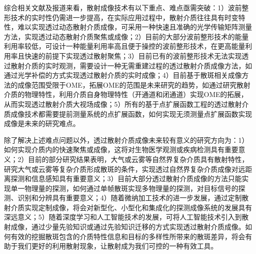 综合相关文献及报道来看，散射成像技术有以下重点、难点亟需突破：1）波前整形技术的实时性仍需进一步提高，在实际应用过程中，散射介质往往具有时变特性，难以实现透过动态散射介质成像，可采用一种快速且准确的光学传输矩阵测量方法，实现透过动态散射介质聚焦或成像；2）目前的大部分波前整形技术的能量利用率较低，可设计一种能量利用率高且便于操控的波前整形技术，在更高能量利用率且快速的前提下实现透过散射聚焦；3）目前已有的波前整形技术无法实现透过散射介质的实时观测，需要设计一种无需重建过程的透过散射介质成像方法，如通过光学补偿的方式实现透过散射介质的实时成像；4）目前基于散斑相关成像方法的成像范围受限于OME，拓展OME的范围是未来研究的趋势，如通过研究散射介质的物理特性，利用介质自身物理特性（开通道和闭通道）实现OME的拓展，从而实现透过散射介质大视场成像；5）所有的基于点扩展函数工程的透过散射介质成像技术都需要提前测量系统的点扩展函数，如何实现无须测量点扩展函数实现成像是未来的研究难点。

除了解决上述难点问题以外，透过散射介质成像未来较有意义的研究方向为：1）如何实现介质内的快速聚焦或成像，这将对生物医学观测或疾病检测具有重要意义；2）目前的部分研究结果表明，大气或云雾等自然界复杂介质具有散射特性，研究大气或云雾等复杂介质形成散斑的条件，实现透过自然界复杂介质成像对远距离探测和信息感知具有重要意义；3）目前大部分透过散射介质成像的方法只能实现单一物理量的探测，如何通过单帧散斑实现多物理量的探测，对目标信号的探测、识别和分辨具有重要意义；4）随着微纳加工技术的进一步发展，通过定制散射介质实现定制成像，将会对新型化、小型化和集成化的探测成像系统的发展具有深远意义；5）随着深度学习和人工智能技术的发展，可将人工智能技术引入到散射成像，通过少量先验知识或通过先验知识迁移的方式实现透过散射介质成像。如何有效的挖掘散斑包含的介质特性信息和目标的多样性所带来的散斑差异，将会有助于我们更好的利用散射现象，让散射成为我们可控的一种有效工具。
